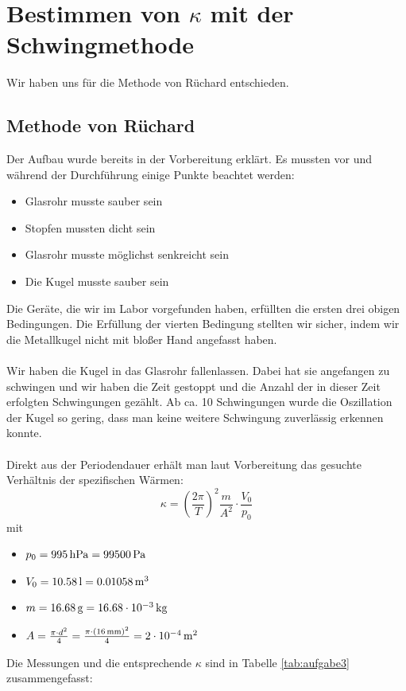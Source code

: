 \documentclass[a4paper,titlepage]{scrartcl}
\numberwithin{equation}{section}
\begin{document}
\section{Bestimmen von $\kappa$ mit der Schwingmethode}
Wir haben uns für die Methode von Rüchard entschieden.
\subsection{Methode von Rüchard}
Der Aufbau wurde bereits in der Vorbereitung erklärt. Es mussten vor und während der Durchführung einige Punkte beachtet werden:
\begin{itemize}
\item Glasrohr musste sauber sein
\item Stopfen mussten dicht sein
\item Glasrohr musste möglichst senkreicht sein
\item Die Kugel musste sauber sein
\end{itemize}
Die Geräte, die wir im Labor vorgefunden haben, erfüllten die ersten drei obigen Bedingungen. Die Erfüllung der vierten Bedingung stellten wir sicher, indem wir die Metallkugel nicht mit bloßer Hand angefasst haben.\\ \\
Wir haben die Kugel in das Glasrohr fallenlassen. Dabei hat sie angefangen zu schwingen und wir haben die Zeit gestoppt und die Anzahl der in dieser Zeit erfolgten Schwingungen gezählt. Ab ca. 10 Schwingungen wurde die Oszillation der Kugel so gering, dass man keine weitere Schwingung zuverlässig erkennen konnte.\\ \\
Direkt aus der Periodendauer erhält man laut Vorbereitung das gesuchte Verhältnis der spezifischen Wärmen:
\begin{equation*}
\kappa = \left( \frac{2 \pi}{T} \right)^2 \frac{m}{A^2} \cdot \frac{V_0}{p_0}
\end{equation*}
mit 
\begin{itemize}
\item $p_0=\unit[995]{hPa}=\unit[99500]{Pa}$
\item $V_0=\unit[10.58]{l}=\unit[0.01058]{m^3}$
\item $m=\unit[16.68]{g}=\unit[16.68 \cdot 10^{-3}]{kg}$
\item $A=\frac{\pi \cdot d^2}{4}=\frac{\pi \cdot (\unit[16]{mm})^2}{4}=\unit[2 \cdot 10^{-4}]{m^2}$
\end{itemize}
Die Messungen und die entsprechende $\kappa$ sind in Tabelle \ref{tab:aufgabe3} zusammengefasst:
\end{document}
